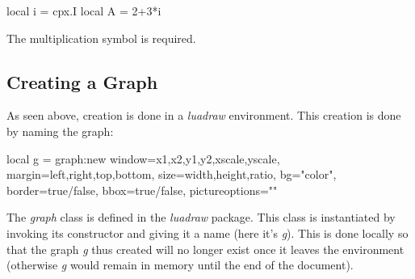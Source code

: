 \begin{Luacode}
local i = cpx.I
local A = 2+3*i
\end{Luacode}

The multiplication symbol is required.

\subsection{Creating a Graph}

As seen above, creation is done in a \emph{luadraw} environment. This creation is done by naming the graph:

\begin{Luacode}
local g = graph:new{ window={x1,x2,y1,y2,xscale,yscale}, margin={left,right,top,bottom},
size={width,height,ratio}, bg="color", border=true/false, bbox=true/false, pictureoptions="" }
\end{Luacode}

The \emph{graph} class is defined in the \emph{luadraw} package. This class is instantiated by invoking its constructor and giving it a name (here it's \emph{g}). This is done locally so that the graph \emph{g} thus created will no longer exist once it leaves the environment (otherwise \emph{g} would remain in memory until the end of the document).

